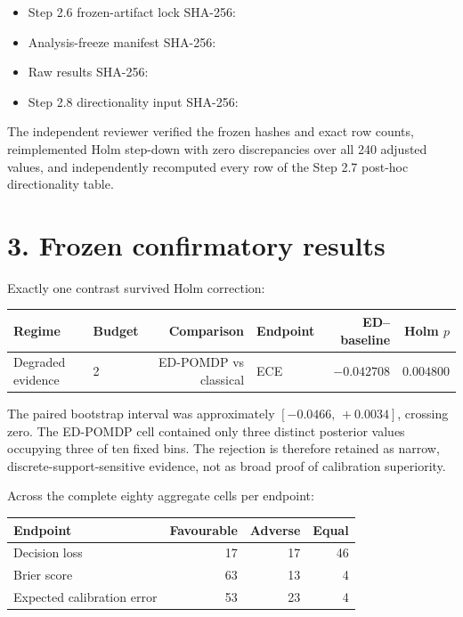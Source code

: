 \documentclass[11pt,a4paper]{article}
\newcommand{\hashline}[1]{\par\vspace{-0.35em}{\footnotesize\ttfamily #1}\par\vspace{-0.15em}}
\begin{document}
\begin{itemize}
  \item Step 2.6 frozen-artifact lock SHA-256:
  \hashline{7acac871ae85343b71b3bbd0cbc399b74075dd45aa4a7f8cdb8acb7f3bf23dd8}
  \item Analysis-freeze manifest SHA-256:
  \hashline{a131b7e4e86dc8a77f7eedfcff47c46f12b915924ead1706d122fd209f7bb5cf}
  \item Raw results SHA-256:
  \hashline{6695ab664fb67ec1eeb60669273aadf6a355a4fcdb45994f3870f638775dd070}
  \item Step 2.8 directionality input SHA-256:
  \hashline{fdad023ffb2ab82a65ec6b8f2cd962b0e0e3421192e4e30e399bed31c82c1339}
\end{itemize}

The independent reviewer verified the frozen hashes and exact row counts, reimplemented Holm step-down with zero discrepancies over all 240 adjusted values, and independently recomputed every row of the Step 2.7 post-hoc directionality table.

\section*{3. Frozen confirmatory results}

Exactly one contrast survived Holm correction:

\begin{center}
\begin{tabularx}{\textwidth}{l l r l r r}
\toprule
Regime & Budget & Comparison & Endpoint & ED--baseline & Holm $p$ \\
\midrule
Degraded evidence & 2 & ED-POMDP vs classical & ECE & $-0.042708$ & $0.004800$ \\
\bottomrule
\end{tabularx}
\end{center}

The paired bootstrap interval was approximately $[-0.0466,\,+0.0034]$, crossing zero. The ED-POMDP cell contained only three distinct posterior values occupying three of ten fixed bins. The rejection is therefore retained as narrow, discrete-support-sensitive evidence, not as broad proof of calibration superiority.

Across the complete eighty aggregate cells per endpoint:

\begin{center}
\begin{tabular}{lrrr}
\toprule
Endpoint & Favourable & Adverse & Equal \\
\midrule
Decision loss & 17 & 17 & 46 \\
Brier score & 63 & 13 & 4 \\
Expected calibration error & 53 & 23 & 4 \\
\bottomrule
\end{tabular}
\end{center}
\end{document}
